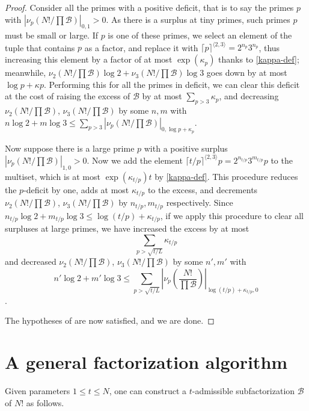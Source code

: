 \documentclass[12pt,a4paper,reqno]{amsart}
\numberwithin{equation}{section}
\theoremstyle{plain}
\theoremstyle{definition}
\newcommand\tuple{{\mathcal B}}
\begin{document}
\begin{proof} Consider all the primes with a positive deficit, that is to say the primes $p$ with $|\nu_p(N!/\prod \tuple)|_{0,1} > 0$.  As there is a surplus at tiny primes, such primes $p$ must be small or large.  If $p$ is one of these primes, we select an element of the tuple that contains $p$ as a factor, and replace it with $\lceil p\rceil^{\langle 2,3 \rangle} = 2^{n_p} 3^{n_p}$, thus increasing this element by a factor of at most $\exp(\kappa_p)$ thanks to \eqref{kappa-def}; meanwhile, $\nu_2(N!/\prod \tuple) \log 2 + \nu_3(N!/\prod \tuple) \log 3$ goes down by at most $\log p + \kappa p$.  Performing this for all the primes in deficit, we can clear this deficit at the cost of raising the excess of $\tuple$ by at most $\sum_{p>3} \kappa_p$, and decreasing $\nu_2(N!/\prod \tuple)$, $\nu_3(N!/\prod \tuple)$ by some $n,m$ with $n \log 2 + m \log 3 \leq \sum_{p>3} |\nu_p(N!/\prod \tuple)|_{0,\log p+\kappa_p}$.  

Now suppose there is a large prime $p$ with a positive surplus
$|\nu_p(N!/\prod \tuple)|_{1,0} > 0$.  Now we add the element $\lceil t/p \rceil^{\langle 2,3 \rangle} p = 2^{n_{t/p}} 3^{m_{t/p}} p$ to the multiset, which is at most $\exp(\kappa_{t/p}) t$ by \eqref{kappa-def}.  This procedure reduces the $p$-deficit by one, adds at most $\kappa_{t/p}$ to the excess, and decrements $\nu_2(N!/\prod \tuple)$, $\nu_3(N!/\prod \tuple)$ by $n_{t/p}, m_{t/p}$ respectively.  Since $n_{t/p} \log 2 + m_{t/p} \log 3 \leq \log(t/p) + \kappa_{t/p}$, if we apply this procedure to clear all surpluses at large primes, we have increased the excess by at most
$$ \sum_{p > \sqrt{t/L}} \kappa_{t/p}$$
and decreased $\nu_2(N!/\prod \tuple)$, $\nu_3(N!/\prod \tuple)$ by some $n',m'$ with 
$$n' \log 2 + m' \log 3 \leq \sum_{p>\sqrt{t/L}} \left|\nu_p\left(\frac{N!}{\prod \tuple}\right)\right|_{\log(t/p)+\kappa_{t/p},0}$$.  

The hypotheses of  are now satisfied, and we are done.
\end{proof}

\section{A general factorization algorithm}

Given parameters $1 \leq t \leq N$, one can construct a $t$-admissible subfactorization $\tuple$ of $N!$ as follows.
\end{document}
